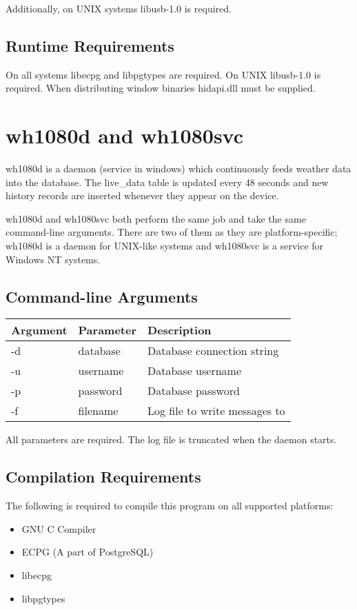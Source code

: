 \documentclass[a4paper,10pt,draft]{book}
\begin{document}
Additionally, on UNIX systems libusb-1.0 is required.

\section{Runtime Requirements}
On all systems libecpg and libpgtypes are required. On UNIX libusb-1.0 is required. When distributing window binaries hidapi.dll must be supplied.

\chapter{wh1080d and wh1080svc}
wh1080d is a daemon (service in windows) which continuously feeds weather data into the database. The live\_data table is updated every 48 seconds and new history records are inserted whenever they appear on the device.

wh1080d and wh1080svc both perform the same job and take the same command-line arguments. There are two of them as they are platform-specific; wh1080d is a daemon for UNIX-like systems and wh1080svc is a service for Windows NT systems. 


\section{Command-line Arguments}
\begin{tabular}{l l p{10cm}}
\hline
\textbf{Argument} & \textbf{Parameter} & \textbf{Description} \\
\hline
-d & database & Database connection string \\
-u & username & Database username \\
-p & password & Database password \\
-f & filename & Log file to write messages to \\
\hline
\end{tabular}

All parameters are required. The log file is truncated when the daemon starts.

\section{Compilation Requirements}
The following is required to compile this program on all supported platforms:
\begin{itemize}
\item GNU C Compiler
\item ECPG (A part of PostgreSQL)
\item libecpg
\item libpgtypes
\end{itemize}
\end{document}
